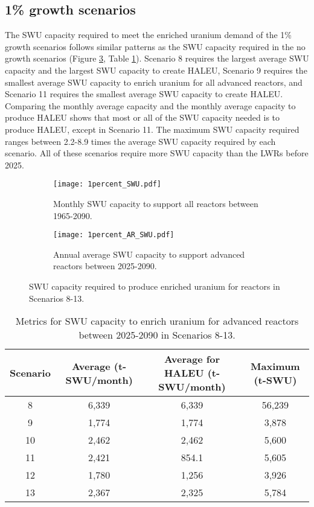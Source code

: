 \subsection{1\% growth scenarios}
The \gls{SWU} capacity required to meet the enriched uranium demand of 
the 1\% growth scenarios 
follows similar patterns as the \gls{SWU} capacity required in the no 
growth scenarios (Figure \ref{fig:1percent_swu}, Table \ref{tab:1percent_swu}).
Scenario 8 requires the largest average \gls{SWU} 
capacity and the largest \gls{SWU} capacity to create \gls{HALEU}, Scenario 
9 requires the smallest average \gls{SWU} capacity to enrich uranium 
for all advanced reactors, and 
Scenario 11 requires the smallest average \gls{SWU} capacity 
to create \gls{HALEU}. Comparing 
the monthly average capacity and the monthly average capacity to produce \gls{HALEU} 
shows that most or all of the \gls{SWU} capacity needed is to produce 
\gls{HALEU}, except in Scenario 11. The 
maximum \gls{SWU} capacity required ranges between 2.2-8.9 times 
the average \gls{SWU} capacity required by each scenario. All of these 
scenarios require more \gls{SWU} capacity than the \glspl{LWR} before 
2025. 

\begin{figure}[h!]
    \centering
    \begin{subfigure}[b]{0.45\textwidth}
        \centering
        \texttt{[image: 1percent\_SWU.pdf]}
        \caption{Monthly \gls{SWU} capacity to support all reactors between 1965-2090.}
        \label{fig:1percent_all_SWU}
    \end{subfigure}
    \hfill
    \begin{subfigure}[b]{0.45\textwidth}
        \centering
        \texttt{[image: 1percent\_AR\_SWU.pdf]}
        \caption{Annual average \gls{SWU} capacity to support advanced reactors between 2025-2090.}
        \label{fig:1percent_AR_SWU}
    \end{subfigure}
       \caption{\gls{SWU} capacity required to produce enriched uranium 
       for reactors in Scenarios 8-13.}
       \label{fig:1percent_swu}
\end{figure}

\begin{table}[h!]
    \centering 
    \caption{Metrics for \gls{SWU} capacity to enrich uranium for 
    advanced reactors between 2025-2090 in Scenarios 8-13.}
    \label{tab:1percent_swu}
    \begin{tabular}{c c c c}
        \hline
        Scenario & Average (t-SWU/month) & Average  
        for \gls{HALEU} (t-SWU/month) & Maximum (t-SWU)\\\hline
        8 & 6,339 & 6,339 & 56,239 \\
        9 & 1,774 & 1,774 & 3,878\\
        10 & 2,462 & 2,462 & 5,600\\
        11 & 2,421 & 854.1 & 5,605\\
        12 & 1,780 & 1,256 & 3,926\\
        13 & 2,367 & 2,325 & 5,784\\
        \hline
    \end{tabular}
\end{table}

